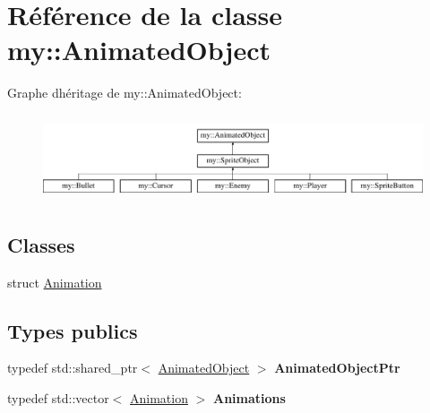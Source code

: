 \hypertarget{classmy_1_1AnimatedObject}{}\section{Référence de la classe my\+:\+:Animated\+Object}
\label{classmy_1_1AnimatedObject}
Graphe d\textquotesingle{}héritage de my\+:\+:Animated\+Object\+:\begin{figure}[H]
\begin{center}
\leavevmode
\includegraphics[height=2.564885cm]{classmy_1_1AnimatedObject}
\end{center}
\end{figure}
\subsection*{Classes}
\begin{DoxyCompactItemize}
\item 
struct \hyperlink{structmy_1_1AnimatedObject_1_1Animation}{Animation}
\end{DoxyCompactItemize}
\subsection*{Types publics}
\begin{DoxyCompactItemize}
\item 
\mbox{\label{classmy_1_1AnimatedObject_a15ca4fc03c83bb613ce972f422ab5ccd}} 
typedef std\+::shared\+\_\+ptr$<$ \hyperlink{classmy_1_1AnimatedObject}{Animated\+Object} $>$ {\bfseries Animated\+Object\+Ptr}
\item 
\mbox{\label{classmy_1_1AnimatedObject_aae6a82042023277647171b52de887b85}} 
typedef std\+::vector$<$ \hyperlink{structmy_1_1AnimatedObject_1_1Animation}{Animation} $>$ {\bfseries Animations}
\end{DoxyCompactItemize}
